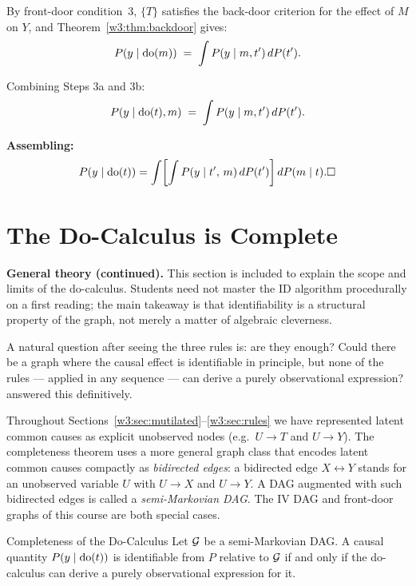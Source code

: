 \documentclass[master.tex]{subfiles}
\begin{document}
\begin{tcolorbox}[defstyle, title={Proof of Theorem~\ref{w3:thm:frontdoor} (Front-Door Formula) via Three Applications of the Rules}]
By front-door condition~3, $\{T\}$ satisfies the back-door criterion for
the effect of $M$ on $Y$, and Theorem~\ref{w3:thm:backdoor} gives:
\[
  P(y \mid \mathrm{do}(m)) \;=\; \int P(y \mid m, t')\,dP(t').
\]

\noindent Combining Steps 3a and 3b:
\[
  P(y \mid \mathrm{do}(t), m) \;=\; \int P(y \mid m, t')\,dP(t').
\]

\noindent\textbf{Assembling:}
\[
  P(y \mid \doop(t))
  = \int\!\left[\int P(y \mid t',\,m)\,dP(t')\right]dP(m \mid t).
  \hfill\square
\]
\end{tcolorbox}

\section{The Do-Calculus is Complete}
\label{w3:sec:completeness}

\noindent\textbf{General theory (continued).}\enspace
This section is included to explain the scope and limits of the
do-calculus.  Students need not master the ID algorithm procedurally on
a first reading; the main takeaway is that identifiability is a structural
property of the graph, not merely a matter of algebraic cleverness.

A natural question after seeing the three rules is: are they enough?
Could there be a graph where the causal effect is identifiable in principle,
but none of the rules --- applied in any sequence --- can derive a purely
observational expression?  \citet{shpitser2006identification} answered this
definitively.

Throughout Sections~\ref{w3:sec:mutilated}--\ref{w3:sec:rules} we have
represented latent common causes as
explicit unobserved nodes (e.g.\ $U \to T$ and $U \to Y$).  The
completeness theorem uses a more general graph class that encodes latent
common causes compactly as \emph{bidirected edges}: a bidirected edge
$X \leftrightarrow Y$ stands for an unobserved variable $U$ with $U \to X$
and $U \to Y$.  A DAG augmented with such bidirected edges is called a
\emph{semi-Markovian DAG}.  The IV DAG and front-door graphs of this course
are both special cases.

\begin{thm}{Completeness of the Do-Calculus \citep{shpitser2006identification}}
\label{w3:thm:completeness}
Let $\mathcal{G}$ be a semi-Markovian DAG.  A causal quantity
$P(y \mid \mathrm{do}(t))$ is identifiable from $P$ relative to $\mathcal{G}$ if and
only if the do-calculus can derive a purely observational expression for it.
\end{thm}
\end{document}
